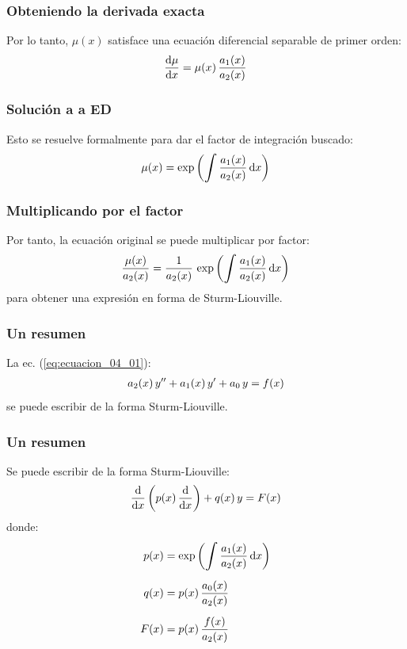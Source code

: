 \documentclass[12pt]{beamer}
\begin{document}
\begin{frame}
\frametitle{Obteniendo la derivada exacta}
Por lo tanto, $\mu (x)$ satisface una ecuación diferencial separable de primer orden:
\pause
\begin{align*}
\dv{\mu}{x} = \mu (x) \, \dfrac{a_{1} (x)}{a_{2} (x)}
\end{align*}
\end{frame}
\begin{frame}
\frametitle{Solución a a ED}
Esto se resuelve formalmente para dar el factor de integración buscado:
\pause
\begin{align*}
\mu (x) = \exp \left( \scaleint{6ex} \, \dfrac{a_{1}(x)}{a_{2}(x)} \dd{x} \right)
\end{align*}
\end{frame}
\begin{frame}
\frametitle{Multiplicando por el factor}
Por tanto, la ecuación original se puede multiplicar por factor:
\pause
\begin{align*}
\dfrac{\mu (x)}{a_{2} (x)} = \dfrac{1}{a_{2} (x)} \, \exp \left( \scaleint{6ex} \, \dfrac{a_{1} (x)}{a_{2} (x)} \dd{x} \right)
\end{align*}
para obtener una expresión en forma de Sturm-Liouville.
\end{frame}
\begin{frame}
\frametitle{Un resumen}
La ec. (\ref{eq:ecuacion_04_01}):
\begin{align*}
a_{2} (x) \, {y}^{\prime \prime} + a_{1} (x) \, {y}^{\prime} + a_{0} \, y = f(x)
\end{align*}
se puede escribir de la forma Sturm-Liouville.
\end{frame}
\begin{frame}
\frametitle{Un resumen}
Se puede escribir de la forma Sturm-Liouville:
\pause
\begin{align}
\dv{x} \left( p(x) \, \dv{x} \right) + q(x) \, y =  F(x)
\label{eq:ecuacion_04_08}
\end{align}
\pause
donde:
\begin{align}
\begin{aligned}
p(x) &= \exp \left( \scaleint{6ex} \, \dfrac{a_{1}(x)}{a_{2}(x)} \dd{x} \right) \\[0.5em]
q(x) &= p(x) \, \dfrac{a_{0}(x)}{a_{2}(x)} \\[0.5em]
F(x) &= p(x) \, \dfrac{f(x)}{a_{2}(x)}
\end{aligned}
\label{eq:ecuacion_04_09}
\end{align}
\end{frame}
\end{document}
